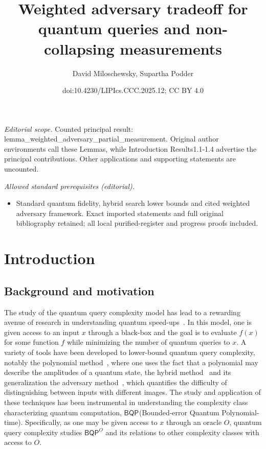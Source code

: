 \documentclass[10pt,a4paper]{article}
\title{Weighted adversary tradeoff for quantum queries and non-collapsing measurements}
\author{David Miloschewsky, Supartha Podder}
\date{doi:10.4230/LIPIcs.CCC.2025.12; CC BY 4.0}
\newcommand{\compclass}[2][]{\ensuremath{\mathsf{#2}^{#1}}\xspace}
\newcommand{\bqpname}[0]{\compclass{BQP}}
\begin{document}
\maketitle
\noindent\textit{Editorial scope.} Counted principal result: lemma\_weighted\_adversary\_partial\_measurement. Original author environments call these Lemmas, while Introduction Results1.1-1.4 advertise the principal contributions. Other applications and supporting statements are uncounted.\par\medskip
\noindent\textit{Allowed standard prerequisites (editorial).}\begin{itemize}
\item Standard quantum fidelity, hybrid search lower bounds and cited weighted adversary framework. Exact imported statements and full original bibliography retained; all local purified-register and progress proofs included.
\end{itemize}\medskip
\section{Introduction}

\subsection{Background and motivation}

The study of the quantum query complexity model has lead to a rewarding avenue of research in understanding quantum speed-ups~\cite{shor_algorithm, bbbv_97, polynomial_method, grover_algorithm}. In this model, one is given access to an input $x$ through a black-box and the goal is to evaluate $f(x)$ for some function $f$ while minimizing the number of quantum queries to $x$. A variety of tools have been developed to lower-bound quantum query complexity, notably the polynomial method~\cite{polynomial_method}, where one uses the fact that a polynomial may describe the amplitudes of a quantum state, the hybrid method~\cite{bbbv_97} and its generalization the adversary method~\cite{adversary_original, adversary_methods_equivalent}, which quantifies the difficulty of distinguishing between inputs with different images. The study and application of these techniques has been instrumental in understanding the complexity class characterizing quantum computation, \bqpname  (Bounded-error Quantum Polynomial-time). Specifically, as one may be given access to $x$ through an oracle $O$, quantum query complexity studies \compclass[O]{BQP} and its relations to other complexity classes with access to $O$.
\end{document}
